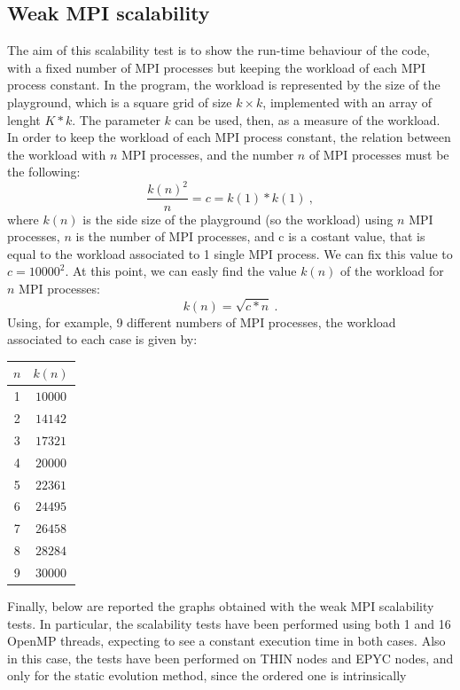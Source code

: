 \documentclass[12pt, titlepage]{report}
\begin{document}
\subsection{Weak MPI scalability}
The aim of this scalability test is to show the run-time behaviour of the code, with a fixed number of MPI processes but keeping the workload of each
MPI process constant. In the program, the workload is represented by the size of the playground, which is a square grid of size $k\times k$, implemented 
with an array of lenght $K*k$. The parameter $k$ can be used, then, as a measure of the workload. In order to keep the workload of each
MPI process constant, the relation between the workload with $n$ MPI processes, and the number $n$ of MPI processes must be the following:
\begin{equation}
	\frac{k(n)^2}{n} = c = k(1)*k(1) \ ,
\end{equation}
where $k(n)$ is the side size of the playground (so the workload) using $n$ MPI processes, $n$ is the number of MPI processes, and c is a costant value, that is equal to the 
workload associated to 1 single MPI process. We can fix this value to $c=10000^2$. At this point, we can easly find the value $k(n)$ of the workload 
for $n$ MPI processes:
\begin{equation}
	k(n) = \sqrt{c*n} \ .
\end{equation}
Using, for example, 9 different numbers of MPI processes, the workload associated to each case is given by:
\begin{center}
	\begin{tabular}{|c c|}
	\hline 
	$n$ & $k(n)$  \\
	\hline
	1 & $10000$ \\
	2 & $14142$	\\
	3 & $17321$	\\
	4 & $20000$	\\
	5 & $22361$	\\
	6 & $24495$	\\
	7 & $26458$	\\
	8 & $28284$	\\
	9 & $30000$	\\
	\hline
	\end{tabular}
\end{center}
Finally, below are reported the graphs obtained with the weak MPI scalability tests. 
In particular, the scalability tests have been performed using both 1 and 16 OpenMP threads, expecting to see a constant execution time in both cases.
Also in this case, the tests have been performed on THIN nodes and EPYC nodes, and only for the static evolution method, since the ordered one is intrinsically
\end{document}
